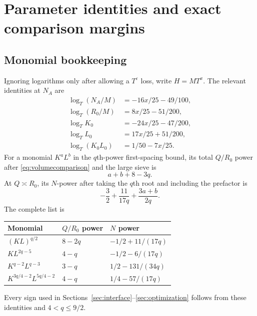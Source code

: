 \documentclass[11pt,reqno]{amsart}
\numberwithin{equation}{section}
\theoremstyle{definition}
\theoremstyle{remark}
\newcommand{\eps}{\varepsilon}
\begin{document}
\section{Parameter identities and exact comparison margins}\label{app:parameters}
\subsection{Monomial bookkeeping}
Ignoring logarithms only after allowing a $T^\eps$ loss, write $H=MT^x$.
The relevant identities at $N_A$ are
\begin{align*}
 \log_T(N_A/M)&=-16x/25-49/100,\\
 \log_T(R_0/M)&=8x/25-51/200,\\
 \log_TK_0&=-24x/25-47/200,\\
 \log_TL_0&=17x/25+51/200,\\
 \log_T(K_0L_0)&=1/50-7x/25.
\end{align*}
For a monomial $K^aL^b$ in the $q$th-power first-spacing bound, its total $Q/R_0$ power after \eqref{eq:volumecomparison} and the large sieve is
\[
 a+b+8-3q.
\]
At $Q\asymp R_0$, its $N$-power after taking the $q$th root and including the prefactor is
\[
 -\frac32+\frac{11}{17q}+\frac{3a+b}{2q}.
\]
The complete list is
\begin{center}
\renewcommand{\arraystretch}{1.45}
\begin{tabular}{@{}lll@{}}
\toprule
Monomial & $Q/R_0$ power & $N$ power\\
\midrule
$(KL)^{q/2}$ & $8-2q$ & $-1/2+11/(17q)$\\
$KL^{2q-5}$ & $4-q$ & $-1/2-6/(17q)$\\
$K^{q-2}L^{q-3}$ & $3-q$ & $1/2-131/(34q)$\\
$K^{3q/4-2}L^{5q/4-2}$ & $4-q$ & $1/4-57/(17q)$\\
\bottomrule
\end{tabular}
\end{center}
Every sign used in Sections~\ref{sec:interface}--\ref{sec:optimization} follows from these identities and $4<q\le9/2$.
\end{document}
